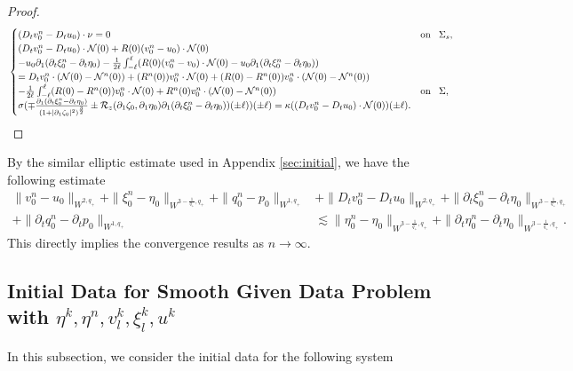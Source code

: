 \documentclass[letterpaper,reqno,10pt,twoside]{amsart}
\theoremstyle{definition}
\theoremstyle{remark}
\def\p{\partial}
\begin{document}
\begin{appendix}
\begin{proof}
\begin{align}{\label{eq:converge_n1}}
\begin{cases}
						(D_{t}v_{0}^{n}-D_{t}u_{0})\cdot \nu=0~~~&\operatorname{on}~~\Sigma_{s},\\
						(D_{t}v_{0}^{n}-D_{t}u_{0})\cdot \mathcal{N}(0)+R(0)(v_{0}^{n}-u_{0})\cdot \mathcal{N}(0)\\-u_{0}\p_{1}(\p_{t}\xi_{0}^{n}-\p_{t}\eta_{0})-{\frac{1}{2\ell}\int_{-\ell}^{\ell}(R(0)(v_{0}^{n}-v_{0})\cdot \mathcal{N}(0)-u_{0}\p_{1}(\p_{t}\xi_{0}^{n}-\p_{t}\eta_{0}))}\\
						=D_{t}v_{0}^{n}\cdot (\mathcal{N}(0)-\mathcal{N}^{n}(0))+(R^{n}(0))v_{0}^{n}\cdot \mathcal{N}(0)+(R(0)-R^{n}(0))v_{0}^{n}\cdot (\mathcal{N}(0)-\mathcal{N}^{n}(0))\\-\frac{1}{2\ell}\int_{-\ell}^{\ell}(R(0)-R^{n}(0))v_{0}^{n}\cdot \mathcal{N}(0)+{R}^n(0)v_{0}^{n}\cdot (\mathcal{N}(0)-\mathcal{N}^{n}(0))~~&\operatorname{on}~~\Sigma,\\
						\sigma(\mp \frac{\partial_{1}(\p_{t}\xi_{0}^{n}-\p_{t}\eta_{0})}{(1+\vert \partial_{1}\zeta_{0}\vert^{2})^{\frac{3}{2}}}\pm \mathcal{R}_{z}(\partial_{1}\zeta_{0},\partial_{1}\eta_{0})\partial_{1}(\p_{t}\xi_{0}^{n}-\p_{t}\eta_{0}))(\pm \ell))(\pm\ell)=\kappa ((D_{t}v_{0}^{n}-D_{t}u_{0})\cdot \mathcal{N}(0))(\pm \ell).
					\end{cases}
				\end{align}
			\end{proof}
			\noindent By the similar elliptic estimate used in Appendix \ref{sec:initial}, we have the following estimate
			\[
			\begin{aligned}
				\|v_{0}^{n}-u_{0}\|_{W^{2,q_{+}}}+\|\xi_{0}^{n}-\eta_{0}\|_{W^{3-\frac{1}{q_{+}},q_{+}}}+\|q_{0}^{n}-p_{0}\|_{W^{1,q_{+}}}&+\|D_{t}v_{0}^{n}-D_{t}u_{0}\|_{W^{2,q_{+}}}+\|\p_{t}\xi_{0}^{n}-\p_{t}\eta_{0}\|_{W^{3-\frac{1}{q_{+}},q_{+}}}\\
				+\|\p_{t}q_{0}^{n}-\p_{t}p_{0}\|_{W^{1,q_{+}}}&\lesssim \|\eta_{0}^{n}-\eta_{0}\|_{W^{3-\frac{1}{q_{+}},q_{+}}}+\|\p_{t}\eta_{0}^{n}-\p_{t}\eta_{0}\|_{W^{3-\frac{1}{q_{+}},q_{+}}}.
			\end{aligned}
			\]
			This directly implies the convergence results as $n\rightarrow \infty$.
			
			\subsection{Initial Data for Smooth Given Data Problem with \texorpdfstring{$\eta^{k},\eta^{n},v_{l}^{k},\xi_{l}^{k},u^{k}$}{}}
			
			In this subsection, we consider the initial data for the following system
			

\end{appendix}
\end{document}
